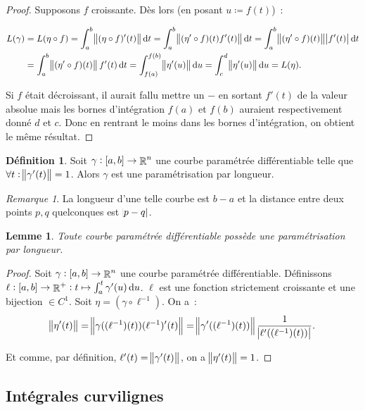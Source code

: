 \documentclass{article}
\DeclareMathOperator{\R}{\mathbb R}
\newcommand{\ab}{\interval ab}
\newtheorem{lem}[thm]{Lemme}
\theoremstyle{definition}
\newtheorem{déf}[thm]{Définition}
\theoremstyle{remark}
\newtheorem*{rmq}{Remarque}
\begin{document}
		\begin{proof} Supposons $f$ croissante. Dès lors (en posant $u \coloneqq f(t)$)~:

		\begin{align*}
			L(\gamma) &= L(\eta \circ f) = \int_a^b\norm{(\eta \circ f)'(t)}\dif t = \int_a^b\norm{(\eta' \circ f)(t)f'(t)}\dif t =
			\int_a^b\norm{(\eta' \circ f)(t)}\abs{f'(t)}\dif t \\
			          &= \int_a^b\norm{(\eta' \circ f)(t)}f'(t)\dif t = \int_{f(a)}^{f(b)}\norm{\eta'(u)}\dif u = \int_c^d\norm{\eta'(u)}\dif u = L(\eta).
		\end{align*}

		Si $f$ était décroissant, il aurait fallu mettre un $-$ en sortant $f'(t)$ de la valeur absolue mais les bornes d'intégration $f(a)$ et $f(b)$ auraient
		respectivement donné $d$ et $c$. Donc en rentrant le moins dans les bornes d'intégration, on obtient le même résultat. \end{proof}

		\begin{déf} Soit $\gamma : \ab \to \R^n$ une courbe paramétrée différentiable telle que $\forall t : \norm{\gamma'(t)} = 1$. Alors $\gamma$
		est une paramétrisation par longueur. \end{déf}

		\begin{rmq} La longueur d'une telle courbe est $b-a$ et la distance entre deux points $p, q$ quelconques est $\abs{p-q}$. \end{rmq}

		\begin{lem} Toute courbe paramétrée différentiable possède une paramétrisation par longueur. \end{lem}

		\begin{proof} Soit $\gamma : \ab \to \R^n$ une courbe paramétrée différentiable. Définissons $\ell : \ab \to \R^+ : t \mapsto \int_a^t\gamma'(u)\dif u$.
		$\ell$ est une fonction strictement croissante et une bijection $\in C^1$. Soit $\eta = (\gamma \circ \ell^{-1})$. On a~:
		\[\norm{\eta'(t)} = \norm{\gamma((\ell^{-1})(t))(\ell^{-1})'(t)} = \norm {\gamma'((\ell^{-1})(t))} \frac 1{\abs{\ell'((\ell^{-1})(t))}}.\]

		Et comme, par définition, $\ell'(t) = \norm{\gamma'(t)}$, on a $\norm{\eta'(t)} = 1$. \end{proof}

	\subsection{Intégrales curvilignes}
\end{document}
